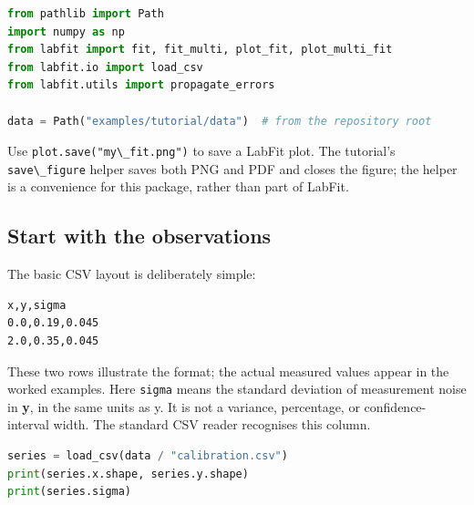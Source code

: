 \documentclass[
  british,
  10pt,
  a4paper,
]{article}
\newcommand{\passthrough}[1]{#1}
\begin{document}
\par\noindent\begin{minipage}{\linewidth}

\begin{lstlisting}[language=Python]
from pathlib import Path
import numpy as np
from labfit import fit, fit_multi, plot_fit, plot_multi_fit
from labfit.io import load_csv
from labfit.utils import propagate_errors

data = Path("examples/tutorial/data")  # from the repository root
\end{lstlisting}

\end{minipage}\par

Use \passthrough{\lstinline!plot.save("my\_fit.png")!} to save a LabFit
plot. The tutorial's \passthrough{\lstinline!save\_figure!} helper saves
both PNG and PDF and closes the figure; the helper is a convenience for
this package, rather than part of LabFit.


\subsection{Start with the
observations}\label{start-with-the-observations}

The basic CSV layout is deliberately simple:

\par\noindent\begin{minipage}{\linewidth}

\begin{lstlisting}
x,y,sigma
0.0,0.19,0.045
2.0,0.35,0.045
\end{lstlisting}

\end{minipage}\par

These two rows illustrate the format; the actual measured values appear
in the worked examples. Here \passthrough{\lstinline!sigma!} means the
standard deviation of measurement noise in \textbf{y}, in the same units
as y. It is not a variance, percentage, or confidence-interval width.
The standard CSV reader recognises this column.

\par\noindent\begin{minipage}{\linewidth}

\begin{lstlisting}[language=Python]
series = load_csv(data / "calibration.csv")
print(series.x.shape, series.y.shape)
print(series.sigma)
\end{lstlisting}

\end{minipage}\par
\end{document}
